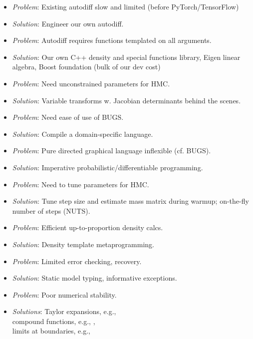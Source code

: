 \documentclass[10pt]{report}
\begin{document}
%
\begin{itemize}
\item {\slshape Problem}:  Existing autodiff slow and limited (before PyTorch/TensorFlow)
\item {\slshape Solution}: Engineer our own autodiff.
%
\vspace*{8pt}
\item {\slshape Problem}:  Autodiff requires functions templated on
  all arguments.
\item {\slshape Solution}: Our own C++ density and special functions library, Eigen linear algebra, Boost foundation (bulk of our dev cost)
%
\vspace*{8pt}
\item {\slshape Problem}:  Need unconstrained parameters for HMC.
\item {\slshape Solution}: Variable transforms w. Jacobian determinants behind the scenes.
%
\end{itemize}


%
\begin{itemize}
\item {\slshape Problem}:  Need ease of use of BUGS.
\item {\slshape Solution}: Compile a domain-specific language.
%
\vspace*{8pt}
\item {\slshape Problem}:  Pure directed graphical language inflexible (cf. BUGS).
\item {\slshape Solution}: Imperative probabilistic/differentiable programming.
\vspace*{8pt}
\item {\slshape Problem}:  Need to tune parameters for HMC.
\item {\slshape Solution}: Tune step size and estimate mass matrix
  during warmup;  on-the-fly number of steps (NUTS).
%
\end{itemize}


%
\begin{itemize}
%
\vspace*{4pt}
\item {\slshape Problem}:  Efficient up-to-proportion density calcs.
\item {\slshape Solution}: Density template metaprogramming.
%
\vspace*{4pt}
\item {\slshape Problem}:  Limited error checking, recovery.
\item {\slshape Solution}: Static model typing, informative exceptions.
%
\vspace*{4pt}
\item {\slshape Problem}:  Poor numerical stability.
\item {\slshape Solutions}:
{
Taylor expansions, e.g., {\small {}}
\\[2pt]
compound functions, e.g., {\small {}, \
}
\\[2pt]
limits at boundaries, e.g., {\small {}}
}
%
\end{itemize}
\end{document}
